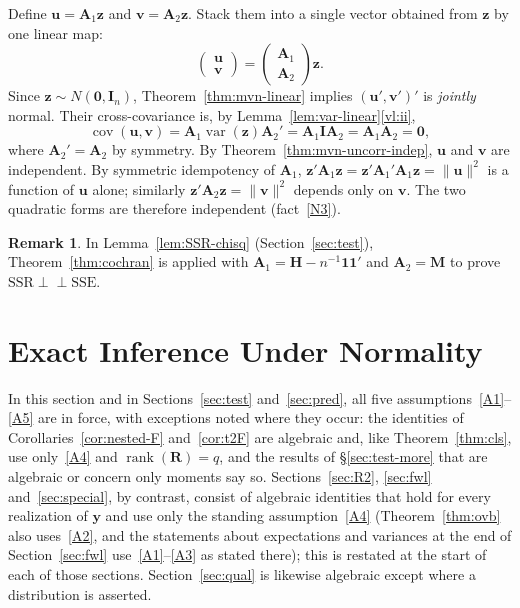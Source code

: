 \documentclass[12pt,a4paper]{article}
\makeatletter
\theoremstyle{definition}
\newtheorem{remark}[theorem]{Remark}
\renewenvironment{proof}[1][\proofname]{\par
  \pushQED{\qed}%
  \normalfont \topsep6\p@\@plus6\p@\relax
  \trivlist
  \item[\hskip\labelsep\bfseries #1\@addpunct{.}]\ignorespaces
}{%
  \popQED\endtrivlist\@endpefalse
}
\DeclareMathOperator\var{var}
\DeclareMathOperator\cov{cov}
\DeclareMathOperator\rank{rank}
\newcommand{\SSR}{\mathrm{SSR}}
\newcommand{\SSE}{\mathrm{SSE}}
\newcommand{\by}{\mathbf{y}}
\newcommand{\bI}{\mathbf{I}}
\newcommand{\bH}{\mathbf{H}}
\newcommand{\bM}{\mathbf{M}}
\newcommand{\bR}{\mathbf{R}}
\newcommand{\bone}{\mathbf{1}}
\newcommand{\bzero}{\mathbf{0}}
\newcommand{\bz}{\mathbf{z}}
\newcommand{\bA}{\mathbf{A}}
\newcommand{\bv}{\mathbf{v}}
\newcommand{\indep}{\perp\!\!\!\perp}
\newcommand{\bu}{\mathbf{u}}
\makeatother
\begin{document}
\begin{proof}
Define $\bu = \bA_1\bz$ and $\bv = \bA_2\bz$. Stack them into a single vector obtained from $\bz$ by one linear map:
\[
\begin{pmatrix}\bu\\\bv\end{pmatrix} = \begin{pmatrix}\bA_1 \\ \bA_2\end{pmatrix}\bz.
\]
Since $\bz \sim N(\bzero, \bI_n)$, Theorem~\ref{thm:mvn-linear} implies $(\bu', \bv')'$ is \emph{jointly} normal. Their cross-covariance is, by Lemma~\ref{lem:var-linear}\ref{vl:ii},
\[
\cov(\bu, \bv) = \bA_1\var(\bz)\bA_2' = \bA_1\bI\bA_2 = \bA_1\bA_2 = \bzero,
\]
where $\bA_2' = \bA_2$ by symmetry. By Theorem~\ref{thm:mvn-uncorr-indep}, $\bu$ and $\bv$ are independent. By symmetric idempotency of $\bA_1$, $\bz'\bA_1\bz = \bz'\bA_1'\bA_1\bz = \|\bu\|^2$ is a function of $\bu$ alone; similarly $\bz'\bA_2\bz = \|\bv\|^2$ depends only on $\bv$. The two quadratic forms are therefore independent (fact~\ref{N3}).
\end{proof}

\begin{remark}\label{rem:cochran-use}
In Lemma~\ref{lem:SSR-chisq} (Section~\ref{sec:test}), Theorem~\ref{thm:cochran} is applied with $\bA_1 = \bH - n^{-1}\bone\bone'$ and $\bA_2 = \bM$ to prove $\SSR \indep \SSE$.
\end{remark}

\section{Exact Inference Under Normality}\label{sec:exact}

In this section and in Sections~\ref{sec:test} and~\ref{sec:pred}, all five assumptions~\ref{A1}--\ref{A5} are in force, with exceptions noted where they occur: the identities of Corollaries~\ref{cor:nested-F} and~\ref{cor:t2F} are algebraic and, like Theorem~\ref{thm:cls}, use only~\ref{A4} and $\rank(\bR) = q$, and the results of \S\ref{sec:test-more} that are algebraic or concern only moments say so. Sections~\ref{sec:R2}, \ref{sec:fwl} and~\ref{sec:special}, by contrast, consist of algebraic identities that hold for every realization of $\by$ and use only the standing assumption~\ref{A4} (Theorem~\ref{thm:ovb} also uses~\ref{A2}, and the statements about expectations and variances at the end of Section~\ref{sec:fwl} use~\ref{A1}--\ref{A3} as stated there); this is restated at the start of each of those sections. Section~\ref{sec:qual} is likewise algebraic except where a distribution is asserted.
\end{document}
